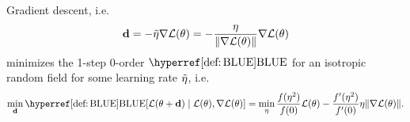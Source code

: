 \begin{corollary}
	Gradient descent, i.e.
	\begin{align*}
		\mathbf{d} = - \tilde{\eta} \nabla\mathcal{L}(\theta)
		= - \frac{\eta}{\|\nabla\mathcal{L}(\theta)\|} \nabla\mathcal{L}(\theta)
	\end{align*}
	minimizes the 1-step 0-order \(\BLUE\) for an isotropic random
	field for some learning rate \(\tilde{\eta}\), i.e.
	\begin{align*}
		\min_{\step}
		\BLUE[\Loss(\param + \step)\mid \Loss(\param), \nabla\Loss(\param)]
		= \min_{\lr} \frac{f(\lr^2)}{f(0)} \Loss(\param)
		- \frac{f'(\lr^2)}{f'(0)} \lr \|\nabla\Loss(\param)\|.
	\end{align*}
\end{corollary}


